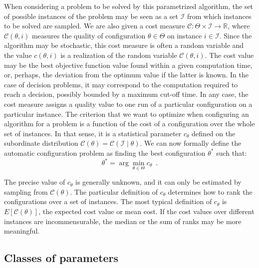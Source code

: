 \documentclass[a4paper]{article}
\begin{document}
When considering a problem to be solved by this parametrized
algorithm, the set of possible instances of the problem may be seen as
a set $\mathcal{I}$ from which instances to be solved are
sampled. We are also given a cost measure $\mathcal{C}\colon \Theta
\times \mathcal{I} \to \mathbb{R}$, where $\mathcal{C}(\theta, i)$
measures the quality of configuration $\theta \in \Theta$ on instance
$i \in \mathcal{I}$. Since the algorithm may be stochastic, this cost
measure is often a random variable and the value $c(\theta, i)$ is a
realization of the random variable $\mathcal{C}(\theta, i)$. The cost
value may be the best objective function value found within a given
computation time, or, perhaps, the deviation from the optimum value if
the latter is known. In the case of decision problems, it may
correspond to the computation required to reach a decision, possibly
bounded by a maximum cut-off time. In any case, the cost measure
assigns a quality value to one run of a particular configuration on a
particular instance. The criterion that we want to optimize when
configuring an algorithm for a problem is a function of the cost of a
configuration over the whole set of instances. In that sense, it is a
statistical parameter $c_\theta$ defined on the subordinate
distribution $\mathcal{C}(\theta) = \mathcal{C}(\mathcal{I} \mid
\theta)$. We can now formally define the automatic configuration
problem as finding the best configuration $\theta^*$ such that:
%
\begin{equation}\label{eq:autoconf}
 \theta^* = \arg\min_{\theta \in \Theta} c_\theta\enspace. 
\end{equation}

The precise value of $c_\theta$ is generally unknown, and it can only
be estimated by sampling from $\mathcal{C}(\theta)$. The particular
definition of $c_\theta$ determines how to rank the configurations
over a set of instances. The most typical definition of $c_\theta$ is
$E[\mathcal{C}(\theta)]$, the expected cost value or mean cost. If the
cost values over different instances are incommensurable, the median
or the sum of ranks may be more meaningful.



\subsection{Classes of parameters}
\end{document}
